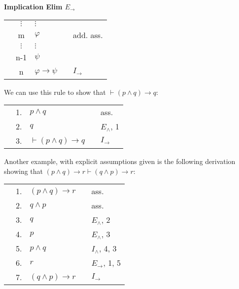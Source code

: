 \documentclass[nobib,nofonts]{tufte-handout}
\begin{document}
\bigskip
\noindent \colorbox{mygray!60}{\centering
  \begin{minipage}[t]{0.35\linewidth}
    \textbf{Implication Elim $E_{\rightarrow}$}
  \end{minipage}
  \begin{minipage}[t]{0.55\linewidth}
    \begin{tabular}{cclcl}
                         & $\vdots$  & $\vdots$                   & \\
      \cline{1-2} \vline & m         & $\varphi$                  & & add. ass.  \\
      \vline             & $ \vdots$ & $\vdots$                   & \\
      \vline             & n-1       & $\psi$                     & & \\ \hline
                         & n         & $\varphi \rightarrow \psi$ & & $I_{\rightarrow}$
    \end{tabular}
  \end{minipage}
}
\bigskip

We can use this rule to show that $\vdash (p \wedge q) \rightarrow q$:

\begin{tabular}{cclcl}
   \cline{1-2} \vline & 1. & $p \wedge q$                        & & ass.  \\
   \vline             & 2. & $q$                                 & & $E_{\wedge}$, 1 \\ \hline
                      & 3. & $\vdash (p \wedge q) \rightarrow q$ & & $I_{\rightarrow}$ \\
\end{tabular}

Another example, with explicit assumptions given is the following derivation showing that  $(p \wedge q) \rightarrow r \vdash (q \wedge p) \rightarrow r$:

\begin{tabular}{cclcl}
                     & 1. & $(p \wedge q) \rightarrow r$ & & ass. \\
  \cline{1-2} \vline & 2. & $q \wedge p$                 & & ass. \\
  \vline             & 3. & $q$                          & & $E_{\wedge}$, 2  \\
  \vline             & 4. & $p$                          & & $E_{\wedge}$, 3  \\
  \vline             & 5. & $p \wedge q$                 & & $I_{\wedge}$, 4, 3  \\
  \vline             & 6. & $r$                          & & $E_{\rightarrow}$, 1, 5  \\ \hline
                     & 7. & $(q \wedge p) \rightarrow r$ & & $I_{\rightarrow}$
\end{tabular}
\end{document}
